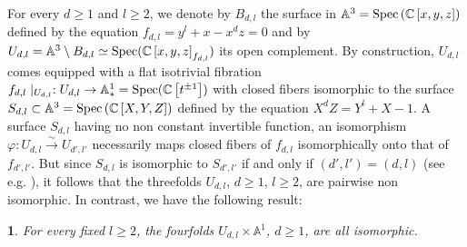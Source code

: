 \documentclass[10pt,oneside,english]{amsart}
\numberwithin{equation}{section}
\numberwithin{figure}{section}
\theoremstyle{plain}
\newtheorem{thm}{\protect\theoremname}
\theoremstyle{remark}
\theoremstyle{plain}
\theoremstyle{plain}
\theoremstyle{definition}
\providecommand{\theoremname}{Theorem}
\begin{document}
For every $d\geq1$ and $l\geq2$, we denote by $B_{d,l}$ the surface
in $\mathbb{A}^{3}={\rm Spec}\left(\mathbb{C}\left[x,y,z\right]\right)$
defined by the equation $f_{d,l}=y^{l}+x-x^{d}z=0$ and by $U_{d,l}=\mathbb{A}^{3}\setminus B_{d,l}\simeq{\rm Spec}(\mathbb{C}\left[x,y,z\right]_{f_{d,l}})$
its open complement. By construction, $U_{d,l}$ comes equipped with
a flat isotrivial fibration $f_{d,l}\mid_{U_{d,l}}:U_{d,l}\rightarrow\mathbb{A}_{*}^{1}={\rm Spec}(\mathbb{C}\left[t^{\pm1}\right])$
with closed fibers isomorphic to the surface $S_{d,l}\subset\mathbb{A}^{3}={\rm Spec}\left(\mathbb{C}\left[X,Y,Z\right]\right)$
defined by the equation $X^{d}Z=Y^{l}+X-1$. A surface $S_{d,l}$
having no non constant invertible function, an isomorphism $\varphi:U_{d,l}\stackrel{\sim}{\rightarrow}U_{d',l'}$
necessarily maps closed fibers of $f_{d,l}$ isomorphically onto that
of $f_{d',l'}$. But since $S_{d,l}$ is isomorphic to $S_{d',l'}$
if and only if $\left(d',l'\right)=\left(d,l\right)$ (see e.g. \cite[Theorem 3.2 and Proposition 3.6]{Dubouloz2009}),
it follows that the threefolds $U_{d,l}$, $d\geq1$, $l\geq2$, are
pairwise non isomorphic. In contrast, we have the following result: 
\begin{thm}
\label{thm:Main} For every fixed $l\geq2$, the fourfolds $U_{d,l}\times\mathbb{A}^{1}$,
$d\geq1$, are all isomorphic. \end{thm}
\end{document}
